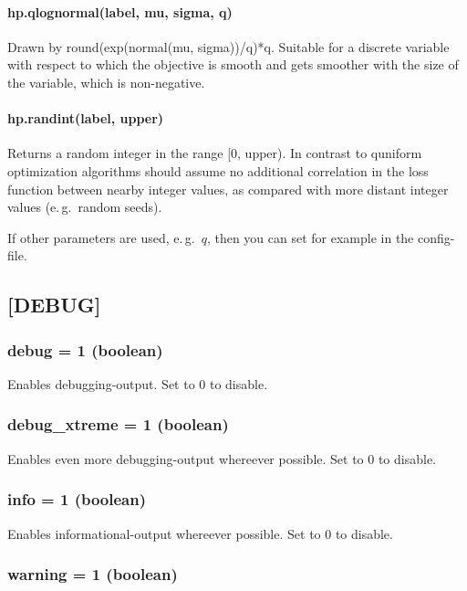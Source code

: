 \documentclass[]{scrartcl}
\begin{document}
        \paragraph{hp.qlognormal(label, mu, sigma, q)}
                        Drawn by round(exp(normal(mu, sigma))/q)*q. Suitable for a
                        discrete variable with respect to which the objective is
                        smooth and gets smoother with the size of the variable,
                        which is non-negative.

        \paragraph{hp.randint(label, upper)}
                        Returns a random integer in the range [0, upper). In
                        contrast to quniform optimization algorithms should assume
                        no additional correlation in the loss function between
                        nearby integer values, as compared with more distant integer
                        values (e.\,g.\ random seeds).

If other parameters are used, e.\,g.\ $q$, then you can set  for example in the config-file.

\subsection{[DEBUG]}
\subsubsection{debug = 1 (boolean)}

Enables debugging-output. Set to 0 to disable.

\subsubsection{debug\_xtreme = 1 (boolean)}

Enables even more debugging-output whereever possible. Set to 0 to disable.

\subsubsection{info = 1 (boolean)}

Enables informational-output whereever possible. Set to 0 to disable.

\subsubsection{warning = 1 (boolean)}
\end{document}
